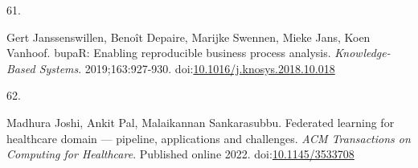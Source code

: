 \documentclass[
  12pt,
]{book}
\newlength{\cslhangindent}
\newlength{\csllabelwidth}
\newenvironment{CSLReferences}[2] %
 {\begin{list}{}{%
  \setlength{\itemindent}{0pt}
  \setlength{\leftmargin}{0pt}
  \setlength{\parsep}{0pt}
  \ifodd #1
   \setlength{\leftmargin}{\cslhangindent}
   \setlength{\itemindent}{-1\cslhangindent}
  \fi
  \setlength{\itemsep}{#2\baselineskip}}}
 {\end{list}}
\newcommand{\CSLLeftMargin}[1]{\parbox[t]{\csllabelwidth}{\strut#1\strut}}
\newcommand{\CSLRightInline}[1]{\parbox[t]{\linewidth - \csllabelwidth}{\strut#1\strut}}
\begin{document}
\begin{CSLReferences}{0}{1}
\CSLLeftMargin{61. }%
\CSLRightInline{Gert Janssenswillen, Benoît Depaire, Marijke Swennen,
Mieke Jans, Koen Vanhoof. {bupaR}: Enabling reproducible business
process analysis. \emph{Knowledge-Based Systems}. 2019;163:927-930.
doi:\href{https://doi.org/10.1016/j.knosys.2018.10.018}{10.1016/j.knosys.2018.10.018}}

\CSLLeftMargin{62. }%
\CSLRightInline{Madhura Joshi, Ankit Pal, Malaikannan Sankarasubbu.
Federated learning for healthcare domain --- pipeline, applications and
challenges. \emph{ACM Transactions on Computing for Healthcare}.
Published online 2022.
doi:\href{https://doi.org/10.1145/3533708}{10.1145/3533708}}

\end{CSLReferences}


\backmatter
\end{document}

